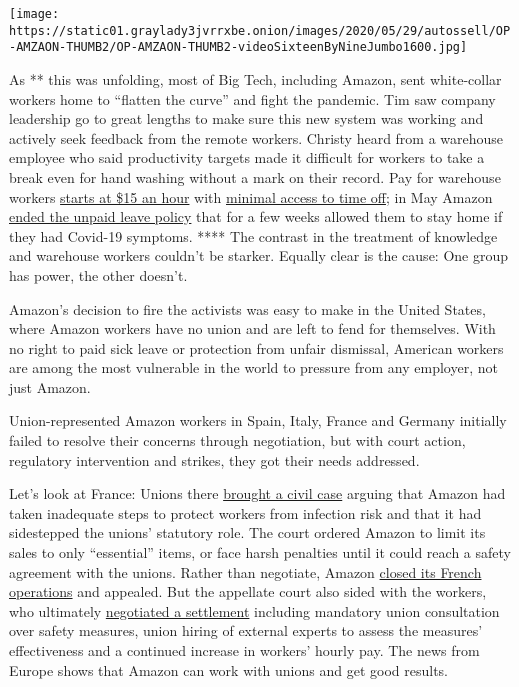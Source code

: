 \texttt{[image: https://static01.graylady3jvrrxbe.onion/images/2020/05/29/autossell/OP-AMZAON-THUMB2/OP-AMZAON-THUMB2-videoSixteenByNineJumbo1600.jpg]}

As ** this was unfolding, most of Big Tech, including Amazon, sent
white-collar workers home to ``flatten the curve'' and fight the
pandemic. Tim saw company leadership go to great lengths to make sure
this new system was working and actively seek feedback from the remote
workers. Christy heard from a warehouse employee who said productivity
targets made it difficult for workers to take a break even for hand
washing without a mark on their record. Pay for warehouse workers
\href{https://www.washingtonpost.com/business/economy/amazons-15-minimum-wage-doesnt-end-debate-over-whether-its-creating-good-jobs/2018/10/05/b1da23a0-c802-11e8-9b1c-a90f1daae309_story.html}{starts
at \$15 an hour} with
\href{https://www.amazon.jobs/en/landing_pages/pto-overview-us}{minimal
access to time off}; in May Amazon
\href{https://www.bloomberg.com/news/articles/2020-04-24/amazon-asks-workers-sheltering-at-home-to-return-or-seek-leave?sref=ExbtjcSG}{ended
the unpaid leave policy} that for a few weeks allowed them to stay home
if they had Covid-19 symptoms. **** The contrast in the treatment of
knowledge and warehouse workers couldn't be starker. Equally clear is
the cause: One group has power, the other doesn't.

Amazon's decision to fire the activists was easy to make in the United
States, where Amazon workers have no union and are left to fend for
themselves. With no right to paid sick leave or protection from unfair
dismissal, American workers are among the most vulnerable in the world
to pressure from any employer, not just Amazon.

Union-represented Amazon workers in Spain, Italy, France and Germany
initially failed to resolve their concerns through negotiation, but with
court action, regulatory intervention and strikes, they got their needs
addressed.

Let's look at France: Unions there
\href{https://www.nytimes3xbfgragh.onion/2020/04/24/business/amazon-france-unions-coronavirus.html}{brought
a civil case} arguing that Amazon had taken inadequate steps to protect
workers from infection risk and that it had sidestepped the unions'
statutory role. The court ordered Amazon to limit its sales to only
``essential'' items, or face harsh penalties until it could reach a
safety agreement with the unions. Rather than negotiate, Amazon
\href{https://www.nytimes3xbfgragh.onion/2020/04/15/business/amazon-france-covid.html}{closed
its French operations} and appealed. But the appellate court also sided
with the workers, who ultimately
\href{https://www.nytimes3xbfgragh.onion/2020/05/16/business/amazon-france-unions-coronavirus.html}{negotiated
a settlement} including mandatory union consultation over safety
measures, union hiring of external experts to assess the measures'
effectiveness and a continued increase in workers' hourly pay. The news
from Europe shows that Amazon can work with unions and get good results.

